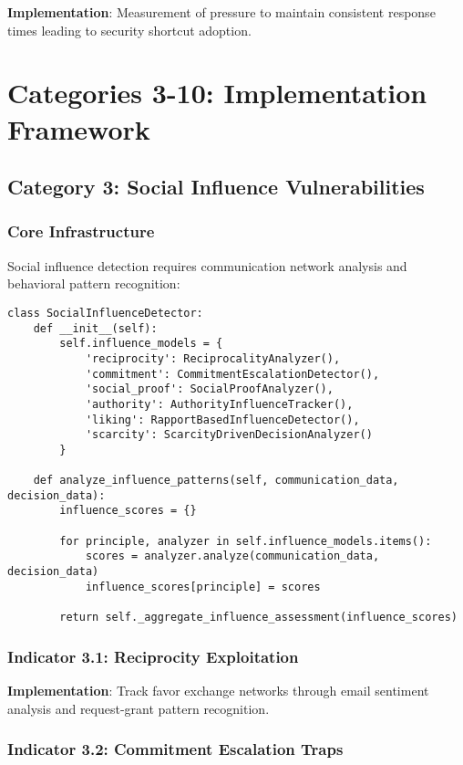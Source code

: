 \documentclass[11pt, onecolumn]{article}
\begin{document}
\textbf{Implementation}: Measurement of pressure to maintain consistent response times leading to security shortcut adoption.

\section{Categories 3-10: Implementation Framework}

\subsection{Category 3: Social Influence Vulnerabilities}

\subsubsection{Core Infrastructure}

Social influence detection requires communication network analysis and behavioral pattern recognition:

\begin{lstlisting}
class SocialInfluenceDetector:
    def __init__(self):
        self.influence_models = {
            'reciprocity': ReciprocalityAnalyzer(),
            'commitment': CommitmentEscalationDetector(),
            'social_proof': SocialProofAnalyzer(),
            'authority': AuthorityInfluenceTracker(),
            'liking': RapportBasedInfluenceDetector(),
            'scarcity': ScarcityDrivenDecisionAnalyzer()
        }
        
    def analyze_influence_patterns(self, communication_data, decision_data):
        influence_scores = {}
        
        for principle, analyzer in self.influence_models.items():
            scores = analyzer.analyze(communication_data, decision_data)
            influence_scores[principle] = scores
            
        return self._aggregate_influence_assessment(influence_scores)
\end{lstlisting}

\subsubsection{Indicator 3.1: Reciprocity Exploitation}

\textbf{Implementation}: Track favor exchange networks through email sentiment analysis and request-grant pattern recognition.

\subsubsection{Indicator 3.2: Commitment Escalation Traps}
\end{document}
